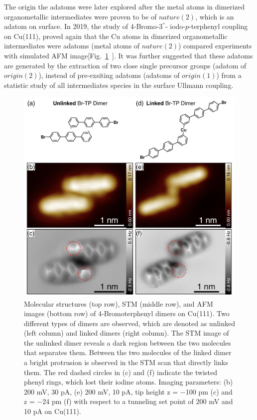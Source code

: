 \documentclass[%
 reprint,
 amsmath,amssymb,
 aps,
prb,
]{revtex4-1}
\begin{document}
The origin the adatoms were later explored after the metal atoms in dimerized organometallic intermediates were proven to be of $nature(2)$, which is an adatom on surface. In 2019, the study of 4‐Bromo-3$^{''}$- iodo‐$p$‐terphenyl coupling on Cu(111), proved again that the Cu atoms in dimerized organometallic intermediates were adatoms (metal atoms of $nature(2)$) compared experiments with simulated AFM image[Fig.~\ref{fig:6}~\cite{acsnano2019}]. It was further suggested that these adatoms are generated by the extraction of two close single precursor groups (adatom of $origin(2)$), instead of pre-exsiting adatoms (adatoms of $origin(1)$) from a statistic study of all intermediates species in the surface Ullmann coupling.
%
\begin{figure}[ht]
\centering
\includegraphics[width=0.75\columnwidth]{Fig/AFM_prove.png}
\caption{Molecular structures (top row), STM (middle row), and AFM images (bottom row) of 4‐Bromoterphenyl dimers on Cu(111). Two different types of dimers are observed, which are denoted as unlinked (left column) and linked dimers (right column). The STM image of the unlinked dimer reveals a dark region between the two molecules that separates them. Between the two molecules of the linked dimer a bright protrusion is observed in the STM scan that directly links them. The red dashed circles in (c) and (f) indicate the twisted phenyl rings, which lost their iodine atoms. Imaging parameters: (b) 200 mV, 30 pA, (e) 200 mV, 10 pA, tip height z = −100 pm (c) and z = −24 pm (f) with respect to a tunneling set point of 200 mV and 10 pA on Cu(111).}
\label{fig:6}
\end{figure}
\end{document}
